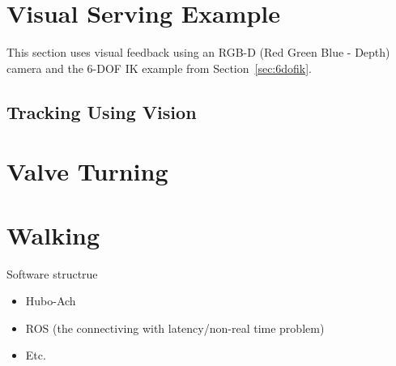 \section{Visual Serving Example}
This section uses visual feedback using an RGB-D (Red Green Blue - Depth) camera and the 6-DOF IK example from Section~\ref{sec:6dofik}.
	\subsection{Tracking Using Vision}
		
		

\section{Valve Turning}
	

\section{Walking}
	









Software structrue
\begin{itemize}
\item Hubo-Ach
\item ROS (the connectiving with latency/non-real time problem)

\item Etc.
\end{itemize}







